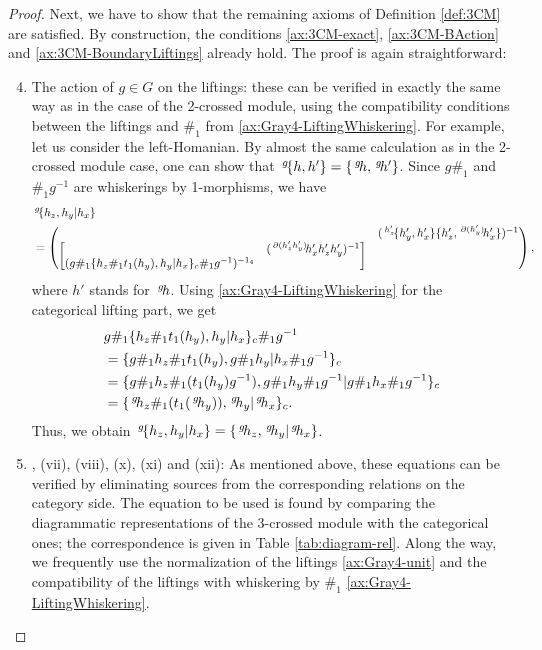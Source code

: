 \documentclass[11pt, reqno]{amsart} %
\newcommand{\act}[1]{\,\sp{#1}\!}
\theoremstyle{definition}
\theoremstyle{remark}
\numberwithin{equation}{section}
\begin{document}
\begin{proof}
Next, we have to show that the remaining axioms of Definition \ref{def:3CM} are satisfied. By construction, the conditions \ref{ax:3CM-exact}, \ref{ax:3CM-BAction} and \ref{ax:3CM-BoundaryLiftings} already hold. The proof is again straightforward:
\begin{enumerate}
  \setcounter{enumi}{3}
  \item The action of $g\in G$ on the liftings: these can be verified in exactly the same way as in the case of the 2-crossed module, using the compatibility conditions between the liftings and $\#_1$ from \ref{ax:Gray4-LiftingWhiskering}. For example, let us consider the left-Homanian. By almost the same calculation as in the 2-crossed module case, one can show that $\act{g}\{h,h'\} = \{\act{g}h,\act{g}h'\}$. Since $g\#_1$ and $\#_1g^{-1}$ are whiskerings by 1-morphisms, we have
  \begin{align*}
    &\act{g}\{h_z,h_y|h_x\} \\
    &= \begin{pmatrix}&(\act{h'_z}\{h'_y,h'_x\}\{h'_z,\act{\partial(h'_y)}h_x'\})^{-1} \\ \begin{bmatrix}&(\act{\partial(h'_zh'_y)}h'_xh'_zh'_y)^{-1} \\ (g\#_1\{h_z\#_1t_1(h_y),h_y|h_x\}_c\#_1g^{-1})^{-1_4} & \end{bmatrix}&\end{pmatrix},
  \end{align*}
  where $h'$ stands for $\act{g}h$. Using \ref{ax:Gray4-LiftingWhiskering} for the categorical lifting part, we get
  \begin{align*}
    &g\#_1\{h_z\#_1t_1(h_y),h_y|h_x\}_c\#_1g^{-1} \\
    &= \{g\#_1h_z\#_1t_1(h_y),g\#_1h_y|h_x\#_1g^{-1}\}_c \\
    &= \{g\#_1h_z\#_1(t_1(h_y)g^{-1}),g\#_1h_y\#_1g^{-1}|g\#_1h_x\#_1g^{-1}\}_c \\
    &= \{\act{g}h_z\#_1(t_1(\act{g}h_y)),\act{g}h_y|\act{g}h_x\}_c.
  \end{align*}
  Thus, we obtain $\act{g}\{h_z,h_y|h_x\} = \{\act{g}h_z,\act{g}h_y|\act{g}h_x\}$. 
  \setcounter{enumi}{5}
  \item, (vii), (viii), (x), (xi) and (xii): As mentioned above, these equations can be verified by eliminating sources from the corresponding relations on the category side. The equation to be used is found by comparing the diagrammatic representations of the 3-crossed module with the categorical ones; the correspondence is given in Table \ref{tab:diagram-rel}. Along the way, we frequently use the normalization of the liftings \ref{ax:Gray4-unit} and the compatibility of the liftings with whiskering by $\#_1$ \ref{ax:Gray4-LiftingWhiskering}.

\end{enumerate}
\end{proof}
\end{document}
